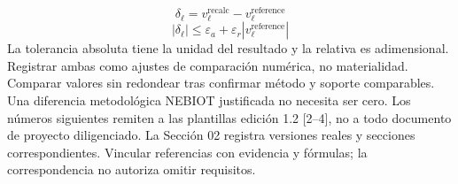 \[\delta_{\ell}=v_{\ell}^{\mathrm{recalc}}-v_{\ell}^{\mathrm{reference}}\]
\[|\delta_{\ell}|\le\varepsilon_a+\varepsilon_r|v_{\ell}^{\mathrm{reference}}|\]
La tolerancia absoluta tiene la unidad del resultado y la relativa es adimensional. Registrar ambas como ajustes de comparación numérica, no materialidad. Comparar valores sin redondear tras confirmar método y soporte comparables. Una diferencia metodológica NEBIOT justificada no necesita ser cero.
Los números siguientes remiten a las plantillas edición 1.2 [2–4], no a todo documento de proyecto diligenciado. La Sección 02 registra versiones reales y secciones correspondientes. Vincular referencias con evidencia y fórmulas; la correspondencia no autoriza omitir requisitos.
